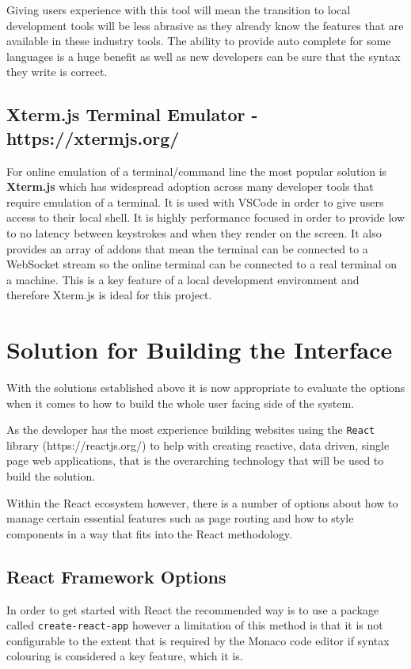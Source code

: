 Giving users experience with this tool will mean the transition to local development tools will be less abrasive as they already know the features that are available in these industry tools. The ability to provide auto complete for some languages is a huge benefit as well as new developers can be sure that the syntax they write is correct.

\subsection{Xterm.js Terminal Emulator - https://xtermjs.org/}

For online emulation of a terminal/command line the most popular solution is \textbf{Xterm.js} which has widespread adoption across many developer tools that require emulation of a terminal. It is used with VSCode in order to give users access to their local shell. It is highly performance focused in order to provide low to no latency between keystrokes and when they render on the screen. It also provides an array of addons that mean the terminal can be connected to a WebSocket stream so the online terminal can be connected to a real terminal on a machine. This is a key feature of a local development environment and therefore Xterm.js is ideal for this project.

\section{Solution for Building the Interface}

With the solutions established above it is now appropriate to evaluate the options when it comes to how to build the whole user facing side of the system.

As the developer has the most experience building websites using the \texttt{React} library (https://reactjs.org/) to help with creating reactive, data driven, single page web applications, that is the overarching technology that will be used to build the solution. 

Within the React ecosystem however, there is a number of options about how to manage certain essential features such as page routing and how to style components in a way that fits into the React methodology.

\subsection{React Framework Options}

In order to get started with React the recommended way is to use a package called \texttt{create-react-app} however a limitation of this method is that it is not configurable to the extent that is required by the Monaco code editor if syntax colouring is considered a key feature, which it is.


